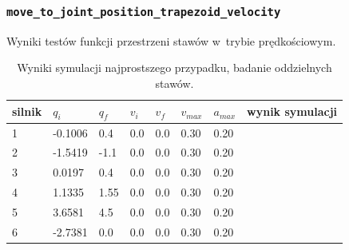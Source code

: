 \documentclass[a4paper, 12pt]{article}
\begin{document}
	\subsubsection{\texttt{move\_to\_joint\_position\_trapezoid\_velocity}}
	Wyniki testów funkcji przestrzeni stawów w~trybie prędkościowym.

	\begin{table}[H]
	\centering
	\begin{tabular}{|m{2.5em}|m{4em}|m{4em}|m{4em}|m{4em}|m{4em}|m{4em}|m{5em}|}
	\hline
	silnik&$ q_i $ & $ q_f $ & $ v_i $ & $ v_f $ & $ v_{max} $ & $ a_{max} $&wynik symulacji\\
	\hline
	\hline
	\hspace{1em}1& -0.1006 & 0.4 & 0.0 & 0.0 & 0.30 & 0.20&\hspace{2em}\checkmark\\ %
	\hline
	\hspace{1em}2& -1.5419 & -1.1 & 0.0 & 0.0 & 0.30 & 0.20&\hspace{2em}\checkmark\\  %
	\hline
	\hspace{1em}3& 0.0197 & 0.4 & 0.0 & 0.0 & 0.30 & 0.20&\hspace{2em}\checkmark\\ %
	\hline
	\hspace{1em}4& 1.1335 & 1.55 & 0.0 & 0.0 & 0.30 & 0.20&\hspace{2em}\checkmark\\  %
	\hline
	\hspace{1em}5& 3.6581 & 4.5 & 0.0 & 0.0 & 0.30 & 0.20&\hspace{2em}\checkmark\\  %
	\hline
	\hspace{1em}6& -2.7381 & 0.0 & 0.0 & 0.0 & 0.30 & 0.20&\hspace{2em}\checkmark\\  %
	\hline
	\end{tabular}
	\caption{Wyniki symulacji najprostszego przypadku, badanie oddzielnych stawów.}
	\label{tab:simpJPV}
	\end{table}
	
\end{document}
